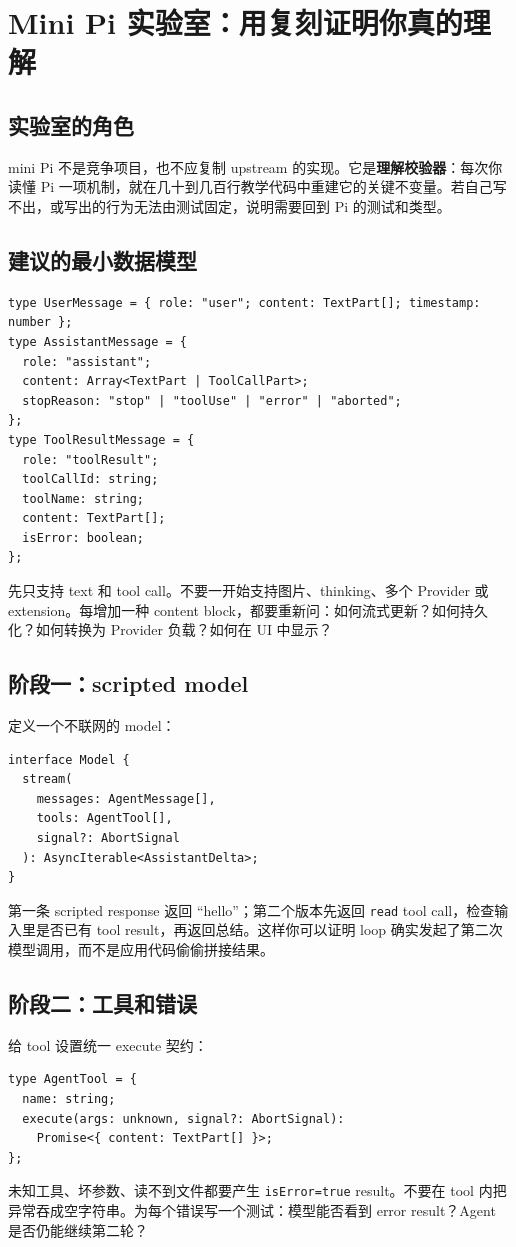 \documentclass[UTF8,openany,11pt]{ctexbook}
\newcommand{\term}[1]{\textbf{#1}}
\begin{document}
\chapter{Mini Pi 实验室：用复刻证明你真的理解}

\section{实验室的角色}
mini Pi 不是竞争项目，也不应复制 upstream 的实现。它是\term{理解校验器}：每次你读懂 Pi 一项机制，就在几十到几百行教学代码中重建它的关键不变量。若自己写不出，或写出的行为无法由测试固定，说明需要回到 Pi 的测试和类型。

\section{建议的最小数据模型}
\begin{Verbatim}[fontsize=\small]
type UserMessage = { role: "user"; content: TextPart[]; timestamp: number };
type AssistantMessage = {
  role: "assistant";
  content: Array<TextPart | ToolCallPart>;
  stopReason: "stop" | "toolUse" | "error" | "aborted";
};
type ToolResultMessage = {
  role: "toolResult";
  toolCallId: string;
  toolName: string;
  content: TextPart[];
  isError: boolean;
};
\end{Verbatim}
先只支持 text 和 tool call。不要一开始支持图片、thinking、多个 Provider 或 extension。每增加一种 content block，都要重新问：如何流式更新？如何持久化？如何转换为 Provider 负载？如何在 UI 中显示？

\section{阶段一：scripted model}
定义一个不联网的 model：
\begin{Verbatim}[fontsize=\small]
interface Model {
  stream(
    messages: AgentMessage[],
    tools: AgentTool[],
    signal?: AbortSignal
  ): AsyncIterable<AssistantDelta>;
}
\end{Verbatim}
第一条 scripted response 返回 ``hello''；第二个版本先返回 \texttt{read} tool call，检查输入里是否已有 tool result，再返回总结。这样你可以证明 loop 确实发起了第二次模型调用，而不是应用代码偷偷拼接结果。

\section{阶段二：工具和错误}
给 tool 设置统一 execute 契约：
\begin{Verbatim}[fontsize=\small]
type AgentTool = {
  name: string;
  execute(args: unknown, signal?: AbortSignal):
    Promise<{ content: TextPart[] }>;
};
\end{Verbatim}
未知工具、坏参数、读不到文件都要产生 \texttt{isError=true} result。不要在 tool 内把异常吞成空字符串。为每个错误写一个测试：模型能否看到 error result？Agent 是否仍能继续第二轮？
\end{document}
